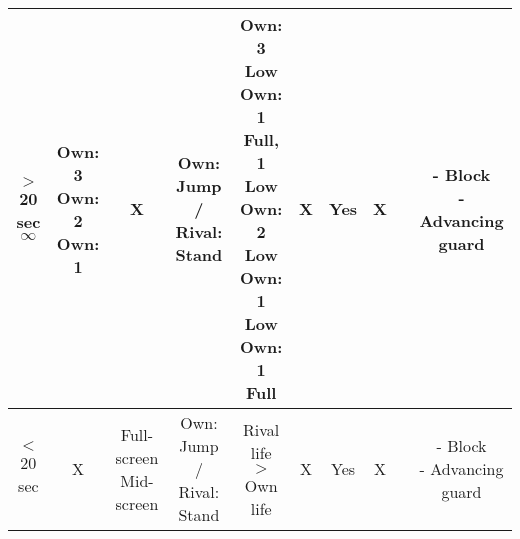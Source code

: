 \documentclass{article}
\begin{document}
\begin{landscape}
\begin{table}[h!]
\begin{center}
\begin{tabular*}{25.5cm}{c|c|c|c|c|c|c|c|c|c}
     \hline
     \makecell{$>$ 20 sec \\ $\infty$} & \makecell{Own: 3 \\ Own: 2 \\ Own: 1} & X & Own: Jump / Rival: Stand & \makecell{Own: 3 Low \\ Own: 1 Full, 1 Low \\ Own: 2 Low \\ Own: 1 Low \\ Own: 1 Full} & X & Yes & X & & \makecell{- Block \\ - Advancing guard}\\
     \hline
     $<$ 20 sec & X & \makecell{Full-screen \\ Mid-screen} & Own: Jump / Rival: Stand & Rival life $>$ Own life & X & Yes & X & & \makecell{- Block \\ - Advancing guard}\\
     \hline
\end{tabular*}
  \end{center}
       \end{table}

\end{landscape}

\newpage
\end{document}
